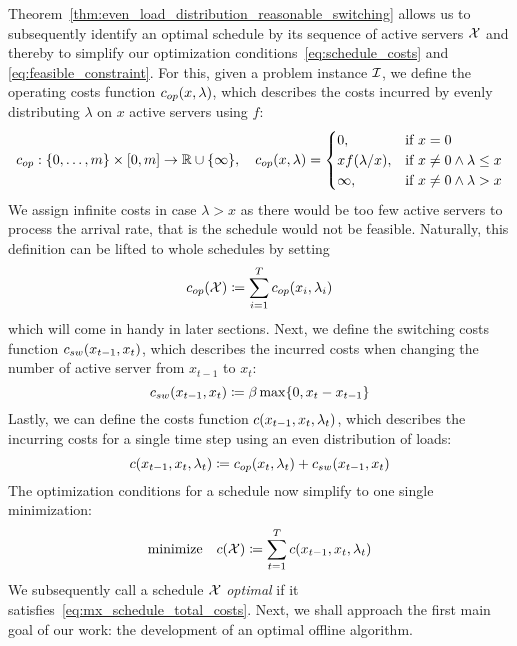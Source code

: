 Theorem~\ref{thm:even_load_distribution_reasonable_switching} allows us to subsequently identify an optimal schedule by its sequence of active servers $\mathcal{X}$ and thereby to simplify our optimization conditions~\eqref{eq:schedule_costs} and \eqref{eq:feasible_constraint}. 
For this, given a problem instance $\mathcal{I}$, we define the operating costs function $c_{op}(x,\lambda)$, which describes the costs incurred by evenly distributing $\lambda$ on $x$ active servers using $f$:
\begin{equation}\label{eq:mx_schedule_op_costs}
	c_{op}:\{0,\dotsc,m\}\times[0,m]\rightarrow\mathbb{R}\cup\{\infty\},\quad c_{op}(x,\lambda)=\begin{cases}
          0, & \text{if $x=0$}\\
	  xf(\lambda/x), & \text{if $x\ne 0\land\lambda\le x$}\\
	  \infty, & \text{if $x\ne 0\land\lambda>x$}
	  \end{cases}
\end{equation}
We assign infinite costs in case $\lambda>x$ as there would be too few active servers to process the arrival rate, that is the schedule would not be feasible. Naturally, this definition can be lifted to whole schedules by setting
\begin{equation}\label{eq:mx_schedule_op_costs_complete}
	c_{op}(\mathcal{X})\coloneqq\sum\limits_{i=1}^Tc_{op}(x_i,\lambda_i)
\end{equation}
which will come in handy in later sections. Next, we define the switching costs function $c_{sw}(x_{t-1},x_t)$, which describes the incurred costs when changing the number of active server from $x_{t-1}$ to $x_t$:
\begin{equation}\label{eq:mx_schedule_sw_costs}
	c_{sw}(x_{t-1},x_t)\coloneqq\beta\max\{0,x_t-x_{t-1}\}
\end{equation}
Lastly, we can define the costs function $c(x_{t-1},x_t,\lambda_t)$, which describes the incurring costs for a single time step using an even distribution of loads:
\begin{equation}\label{eq:mx_schedule_costs}
	c(x_{t-1},x_{t},\lambda_t)\coloneqq c_{op}(x_t,\lambda_t)+c_{sw}(x_{t-1},x_t)
\end{equation}
The optimization conditions for a schedule now simplify to one single minimization:
\begin{align}
	\text{minimize}\quad c(\mathcal{X})\coloneqq\sum\limits_{t=1}^{T}c(x_{t-1},x_{t},\lambda_t)\label{eq:mx_schedule_total_costs}
\end{align}
We subsequently call a schedule $\mathcal{X}$ \emph{optimal} if it satisfies~\eqref{eq:mx_schedule_total_costs}. Next, we shall approach the first main goal of our work: the development of an optimal offline algorithm.
